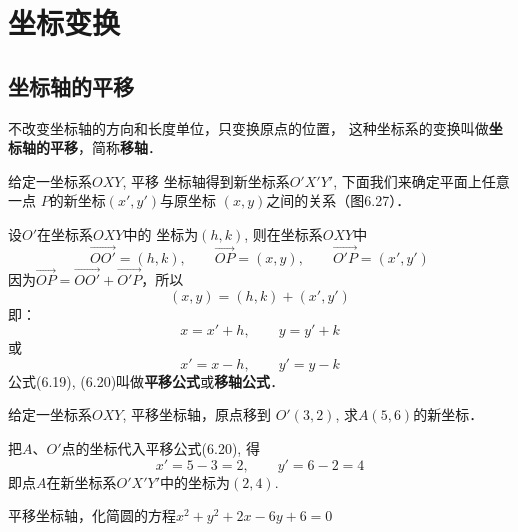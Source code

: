 \section{坐标变换}
\subsection{坐标轴的平移}
不改变坐标轴的方向和长度单位，只变换原点的位置，
这种坐标系的变换叫做\textbf{坐标轴的平移}，简称\textbf{移轴}．

给定一坐标系$OXY$, 平移
坐标轴得到新坐标系$O'X'Y'$, 
下面我们来确定平面上任意一点
$P$的新坐标$(x',y')$与原坐标
$(x,y)$之间的关系（图6.27）．

\begin{figure}[htp]
    \centering
{}
    \caption{}
\end{figure}

设$O'$在坐标系$OXY$中的
坐标为$(h,k)$, 则在坐标系$OXY$中
\[\Vec{OO'}=(h,k),\qquad \Vec{OP}=(x,y),\qquad \Vec{O'P}=(x',y')\]
因为$\Vec{OP}=\Vec{OO'}+\Vec{O'P}$，所以
\[(x,y)=(h,k)+(x',y')\]
即：
\begin{equation}
    x=x'+h,\qquad y=y'+k
\end{equation}
或
\begin{equation}
    x'=x-h,\qquad y'=y-k
\end{equation}
公式(6.19), (6.20)叫做\textbf{平移公式}或\textbf{移轴公式}．


\begin{example}
    给定一坐标系$OXY$, 平移坐标轴，原点移到
    $O'(3,2)$, 求$A(5,6)$的新坐标．
\end{example}

\begin{solution}
把$A$、$O'$点的坐标代入平移公式(6.20), 得
    \[x'=5-3=2,\qquad y'=6-2=4\]
    即点$A$在新坐标系$O'X'Y'$中的坐标为$(2,4)$.     
\end{solution}



\begin{example}
    平移坐标轴，化简圆的方程$x^2+y^2+2x-6y+6=0$
\end{example}


